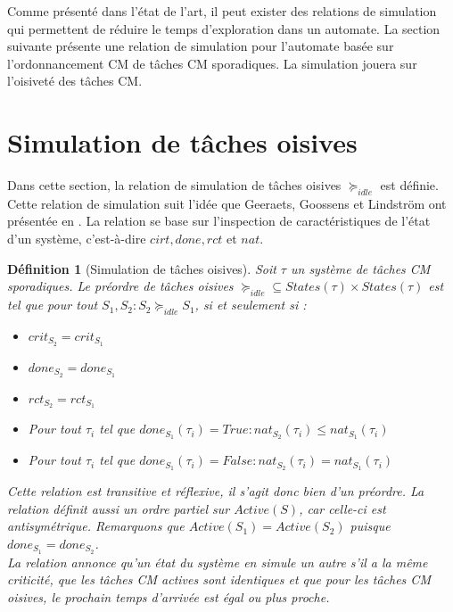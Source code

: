 \documentclass[12pt,a4paper,oneside]{book}
\theoremstyle{break}
\newtheorem{defin}{Définition}[chapter]
\theoremstyle{breakplain}
\begin{document}
Comme présenté dans l'état de l'art, il peut exister des relations de simulation qui permettent de réduire le temps d'exploration dans un automate. La section suivante présente une relation de simulation pour l'automate basée sur l'ordonnancement CM de tâches CM sporadiques. La simulation jouera sur l'oisiveté des tâches CM.\\

\section{Simulation de tâches oisives}
Dans cette section, la relation de simulation de tâches oisives $\succeq_{idle}$ est définie. Cette relation de simulation suit l'idée que Geeraets, Goossens et Lindström ont présentée en \cite{geeraerts2013multiprocessor}. La relation se base sur l'inspection de caractéristiques de l'état d'un système, c'est-à-dire $cirt, done, rct$ et $nat$.\\

\begin{defin}[Simulation de tâches oisives]
\label{idle:sim}
Soit $\tau$ un système de tâches CM sporadiques. Le préordre de tâches oisives $\succeq_{idle} \subseteq States(\tau)\times States(\tau)$ est tel que pour tout $S_1, S_2 : S_2 \succeq_{idle}S_1$, si et seulement si :
\begin{itemize}
\item $crit_{S_2} = crit_{S_1}$
\item $done_{S_2} = done_{S_1}$
\item $rct_{S_2} = rct_{S_1}$
\item Pour tout $\tau_i$ tel que $done_{S_1}(\tau_i) = True : nat_{S_2}(\tau_i) \leq nat_{S_1}(\tau_i)$
\item Pour tout $\tau_i$ tel que $done_{S_1}(\tau_i) = False : nat_{S_2}(\tau_i) = nat_{S_1}(\tau_i)$\\
\end{itemize}

Cette relation est transitive et réflexive, il s'agit donc bien d'un préordre. La relation définit aussi un ordre partiel sur $Active(S)$, car celle-ci est antisymétrique.
Remarquons que $Active(S_1) = Active (S_2)$ puisque $done_{S_1} = done_{S_2}$.\\

La relation annonce qu'un état du système en simule un autre s'il a la même criticité, que les tâches CM actives sont identiques et que pour les tâches CM oisives, le prochain temps d'arrivée est égal ou plus proche.
\end{defin}
\end{document}
